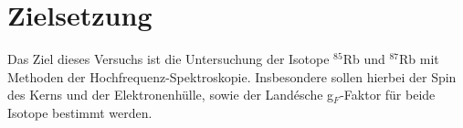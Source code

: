 \section{Zielsetzung}
Das Ziel dieses Versuchs ist die Untersuchung der Isotope $^85$Rb und $^87$Rb mit Methoden der Hochfrequenz-Spektroskopie. Insbesondere sollen hierbei der Spin des Kerns und der Elektronenhülle, sowie der Landésche g$_F$-Faktor für beide Isotope bestimmt werden.
